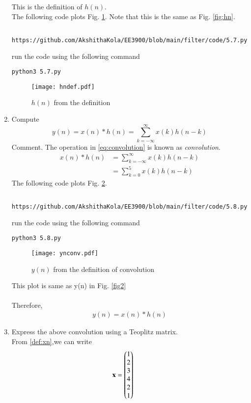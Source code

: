\documentclass[journal,12pt,twocolumn]{IEEEtran}
\renewcommand\thesection{\arabic{section}}
\begin{document}
\begin{enumerate}[label=\thesection.\arabic*]
%
This is the definition of $h(n)$.
\\
\solution The following code plots Fig. \ref{fig:hndef}. Note that this is the same as Fig. \ref{fig:hn}. 
%
\begin{lstlisting}
	https://github.com/AkshithaKola/EE3900/blob/main/filter/code/5.7.py
\end{lstlisting}
run the code using the following command
\begin{lstlisting}
python3 5.7.py
\end{lstlisting}
\begin{figure}[!ht]
\centering
\texttt{[image: hndef.pdf]}
\caption{$h(n)$ from the definition}
\label{fig:hndef}
\end{figure}
\item Compute 
%
\begin{equation}
\label{eq:convolution}
y(n) = x(n)*h(n) = \sum_{k=-\infty}^{\infty}x(k)h(n-k)
\end{equation}
%
Comment. The operation in \eqref{eq:convolution} is known as
{\em convolution}.
%
\\
\solution 
\begin{align}
x(n)*h(n) &= \sum_{k=-\infty}^{\infty}x(k)h(n-k)\\ &= \sum_{k=0}^{5}x(k)h(n-k)
\end{align}
The following code plots Fig. \ref{fig:ynconv}.
%
\begin{lstlisting}
	https://github.com/AkshithaKola/EE3900/blob/main/filter/code/5.8.py
\end{lstlisting}
run the code using the following command
\begin{lstlisting}
python3 5.8.py
\end{lstlisting}
\begin{figure}[!htbp]
\centering
\texttt{[image: ynconv.pdf]}
\caption{$y(n)$ from the definition of convolution}
\label{fig:ynconv}
\end{figure}
This plot is same as y(n) in Fig. \ref{fig2}\\\\
Therefore,
\begin{align}
y(n) = x(n) * h(n)
\end{align}
\item Express the above convolution using a Teoplitz matrix.\\
\solution From \eqref{def:xn},we can write
\begin{align}
\vec{x} = \myvec{1 \\ 2 \\ 3 \\ 4 \\ 2 \\ 1} \qquad

\end{align}
\end{enumerate}
\end{document}
